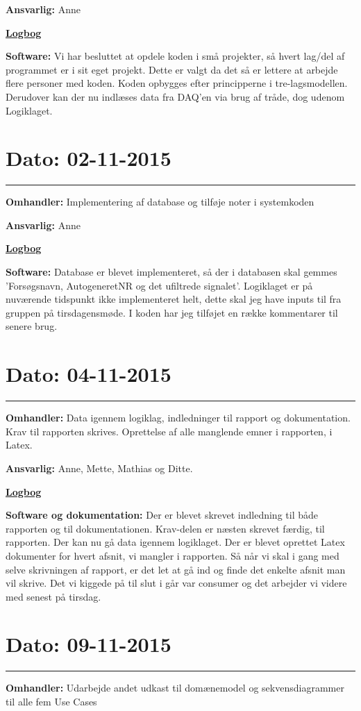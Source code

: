 \textbf{Ansvarlig:} Anne

\underline{\textbf{Logbog}}

\textbf{Software: }Vi har besluttet at opdele koden i små projekter, så hvert lag/del af programmet er i sit eget projekt. Dette er valgt da det så er lettere at arbejde flere personer med koden. Koden opbygges efter principperne i tre-lagsmodellen. Derudover kan der nu indlæses data fra DAQ'en via brug af tråde, dog udenom Logiklaget. 
\\

\section{Dato: 02-11-2015}
\hrule
\textbf{Omhandler:} Implementering af database og tilføje noter i systemkoden

\textbf{Ansvarlig:} Anne

\underline{\textbf{Logbog}}

\textbf{Software: }Database er blevet implementeret, så der i databasen skal gemmes 'Forsøgsnavn, AutogeneretNR og det ufiltrede signalet'. Logiklaget er på nuværende tidspunkt ikke implementeret helt, dette skal jeg have inputs til fra gruppen på tirsdagensmøde.  
I koden har jeg tilføjet en række kommentarer til senere brug.
\\

\section{Dato: 04-11-2015}
\hrule
\textbf{Omhandler:} Data igennem logiklag, indledninger til rapport og dokumentation. Krav til rapporten skrives. 
Oprettelse af alle manglende emner i rapporten, i Latex. 

\textbf{Ansvarlig:} Anne, Mette, Mathias og Ditte. 

\underline{\textbf{Logbog}}

\textbf{Software og dokumentation: }Der er blevet skrevet indledning til både rapporten og til dokumentationen. Krav-delen er næsten skrevet færdig, til rapporten. 
Der kan nu gå data igennem logiklaget. 
Der er blevet oprettet Latex dokumenter for hvert afsnit, vi mangler i rapporten. Så når vi skal i gang med selve skrivningen af rapport, er det let at gå ind og finde det enkelte afsnit man vil skrive. 
Det vi kiggede på til slut i går var consumer og det arbejder vi videre med senest på tirsdag. 
\\

\section{Dato: 09-11-2015}
\hrule
\textbf{Omhandler:} Udarbejde andet udkast til domænemodel og sekvensdiagrammer til alle fem Use Cases

